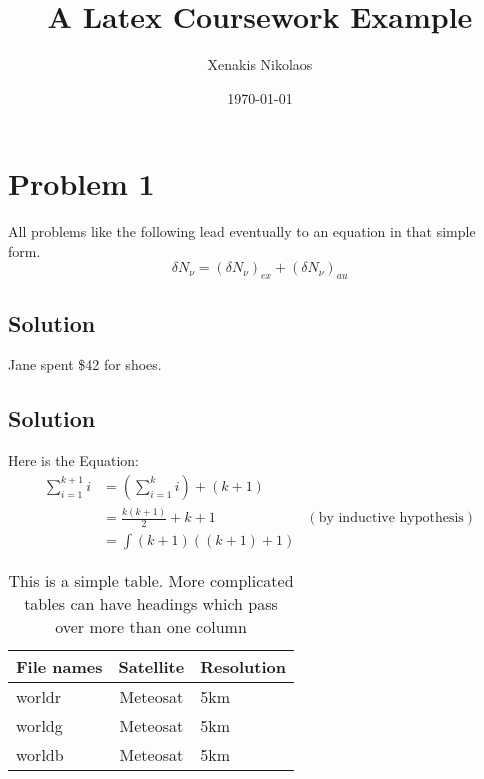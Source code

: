\documentclass[12pt,a4paper]{article}
\begin{document}
\title{A Latex Coursework Example}
\author{Xenakis Nikolaos}
\date{\today}

\makeEPCCtitle

\thispagestyle{empty}

\newpage


\newpage

\section{Problem 1}
All problems like the following lead eventually to an equation in that simple form.
\begin{equation} \delta N_{\nu} = (\delta N_{\nu})_{ex} + (\delta N_{\nu})_{au} 
	\label{equation:delsplit}
\end{equation}

\subsection{Solution}
Jane spent \$42 for shoes.

\subsection{Solution}
Here is the Equation:
\begin{align*}
	\sum_{i=1}^{k+1}i & = \left(\sum_{i=1}^{k}i\right) +(k+1)\\ 
	& = \frac{k(k+1)}{2}+k+1 & (\text{by inductive hypothesis})\\
	& = \int{(k+1)((k+1)+1)}
\end{align*}

\begin{table}[h]
	\begin{center}
		\begin{tabular}{||l|c|l||}
			\hline
			{\bf File names} & {\bf Satellite} & {\bf Resolution}\\
			\hline
			worldr         &  Meteosat     &   5km\\
			worldg         &  Meteosat     &   5km\\
			worldb         &  Meteosat     &   5km\\
			\hline
		\end{tabular}
	\end{center}
	\caption{This is a simple table. More complicated tables can have
		headings which pass over more than one column}
	\label{simple_table}
\end{table}
\end{document}
